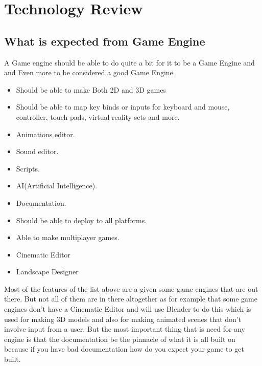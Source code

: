 \chapter{Technology Review}
\section{What is expected from Game Engine}
A Game engine should be able to do quite a bit for it to be a Game Engine and and Even more to be considered a good Game Engine
\begin{itemize}
    \item Should be able to make Both 2D and 3D games 
    \item Should be able to map key binds or inputs for keyboard and mouse, controller, touch pads, virtual reality sets and more.
    \item Animations editor.
    \item Sound editor.
    \item Scripts.
    \item AI(Artificial Intelligence).
    \item Documentation.
    \item Should be able to deploy to all platforms.
    \item Able to make multiplayer games.
    \item Cinematic Editor
    \item Landscape Designer
\end{itemize}
Most of the features of the list above are a given some game engines that are out there. But not all of them are in there altogether as for example that some game engines don't have a Cinematic Editor and will use Blender to do this which is used for making 3D models and also for making animated scenes that don't involve input from a user. But the most important thing that is need for any engine is that the documentation be the pinnacle of what it is all built on because if you have bad documentation how do you expect your game to get built. 
